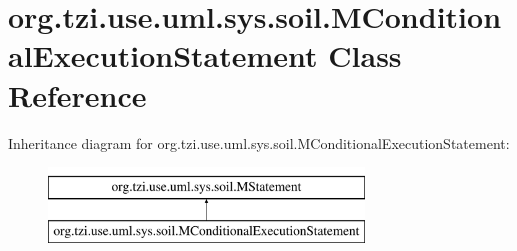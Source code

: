 \hypertarget{classorg_1_1tzi_1_1use_1_1uml_1_1sys_1_1soil_1_1_m_conditional_execution_statement}{\section{org.\-tzi.\-use.\-uml.\-sys.\-soil.\-M\-Conditional\-Execution\-Statement Class Reference}
\label{classorg_1_1tzi_1_1use_1_1uml_1_1sys_1_1soil_1_1_m_conditional_execution_statement}
}
Inheritance diagram for org.\-tzi.\-use.\-uml.\-sys.\-soil.\-M\-Conditional\-Execution\-Statement\-:\begin{figure}[H]
\begin{center}
\leavevmode
\includegraphics[height=2.000000cm]{classorg_1_1tzi_1_1use_1_1uml_1_1sys_1_1soil_1_1_m_conditional_execution_statement}
\end{center}
\end{figure}
